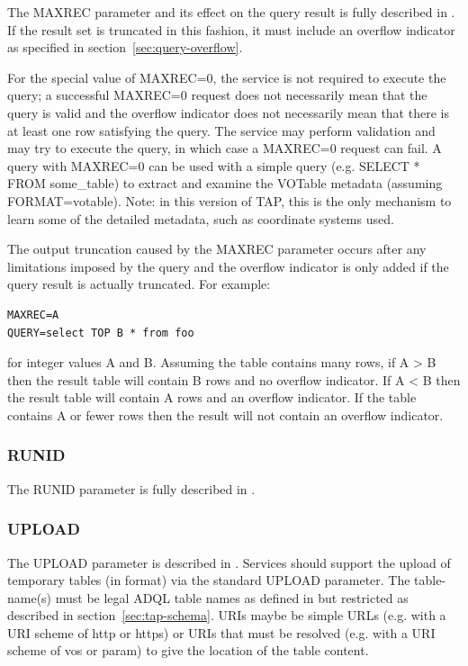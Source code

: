 \documentclass[11pt,letter]{ivoa}
\begin{document}
The MAXREC parameter and its effect on the query result is fully described in 
\citep{std:DALI}. If the result set is truncated in this fashion, it must 
include an overflow indicator as specified in section~\ref{sec:query-overflow}.

For the special value of MAXREC=0, the service is not required to execute the 
query; a successful  MAXREC=0 request does not necessarily mean that the query 
is valid and the overflow indicator does not necessarily mean that there is at 
least one row satisfying the query. The service may perform validation and may 
try to execute the query, in which case a MAXREC=0 request can fail. A query 
with MAXREC=0 can be used with a simple query (e.g. SELECT * FROM  
some\_table) to extract and examine the VOTable metadata (assuming 
FORMAT=votable). Note: in this version of TAP, this is the only mechanism to 
learn some of the detailed metadata, such as coordinate systems used.

The output truncation caused by the MAXREC parameter occurs after any 
limitations imposed by the query and the overflow indicator is only added if 
the query result is actually truncated. For example:

\begin{verbatim}
MAXREC=A
QUERY=select TOP B * from foo
\end{verbatim}

for integer values A and B. Assuming the table contains many rows, if A > B 
then the result table will contain B rows and no overflow indicator. If A < B 
then the result table will contain A rows and an overflow indicator. If the 
table contains A or fewer rows then the result will not contain an overflow 
indicator.

\subsubsection{RUNID}
The RUNID parameter is fully described in \citep{std:DALI}.

\subsubsection{UPLOAD}
\label{sec:UPLOAD}

The UPLOAD parameter is described in \citep{std:DALI}. Services should support 
the 
upload of temporary tables (in \citep{std:VOTable} format) via the standard 
UPLOAD 
parameter. The table-name(s) must be legal ADQL table names as defined in 
\citep{std:ADQL} but restricted as described in section~\ref{sec:tap-schema}. 
URIs maybe be simple URLs (e.g. with a URI scheme of http or https) or 
URIs that must be resolved (e.g. with a URI scheme of vos or param) to give 
the location of the table content.
\end{document}
